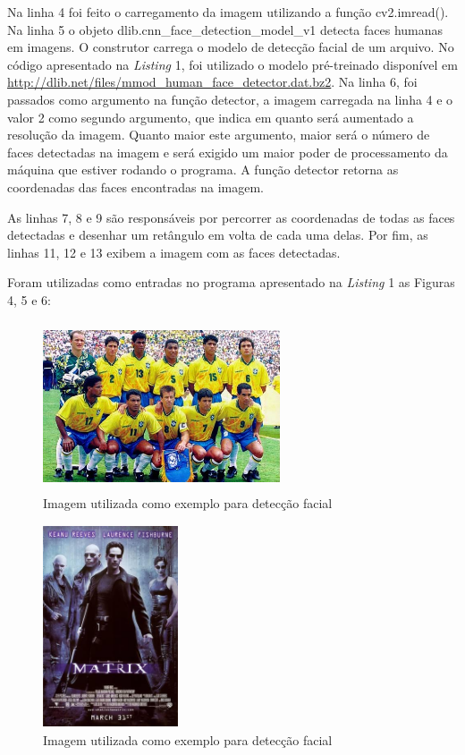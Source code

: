 \documentclass[conference]{IEEEtran}
\begin{document}
         Na linha 4 foi feito o carregamento da imagem utilizando a função cv2.imread(). Na linha 5 o objeto dlib.cnn\_face\_detection\_model\_v1 detecta faces humanas em imagens. O construtor carrega o modelo de detecção facial de um arquivo. No código apresentado na \textit{Listing} 1, foi utilizado o modelo pré-treinado disponível em \url{http://dlib.net/files/mmod\_human\_face\_detector.dat.bz2}. Na linha 6, foi passados como argumento na função detector, a imagem carregada na linha 4 e o valor 2 como segundo argumento, que indica em quanto será aumentado a resolução da imagem. Quanto maior este argumento, maior será o número de faces detectadas na imagem e será exigido um maior poder de processamento da máquina que estiver rodando o programa. A função detector retorna as coordenadas das faces encontradas na imagem.
         
         As linhas 7, 8 e 9 são responsáveis por percorrer as coordenadas de todas as faces detectadas e desenhar um retângulo em volta de cada uma delas. Por fim, as linhas 11, 12 e 13 exibem a imagem com as faces detectadas.
         
         Foram utilizadas como entradas no programa apresentado na \textit{Listing} 1 as Figuras 4, 5 e 6:
         
         \begin{figure}[h!b]
			\centering \includegraphics[width=7cm,height=5cm]{brasil_1994.jpg}
			\caption{Imagem utilizada como exemplo para detecção facial \cite{b5}} 
		\end{figure}
		
	    \begin{figure}[h!b]
			\centering \includegraphics[width=4cm,height=6cm]{matrix.jpg}
			\caption{Imagem utilizada como exemplo para detecção facial \cite{b6}} 
		\end{figure}
\end{document}
